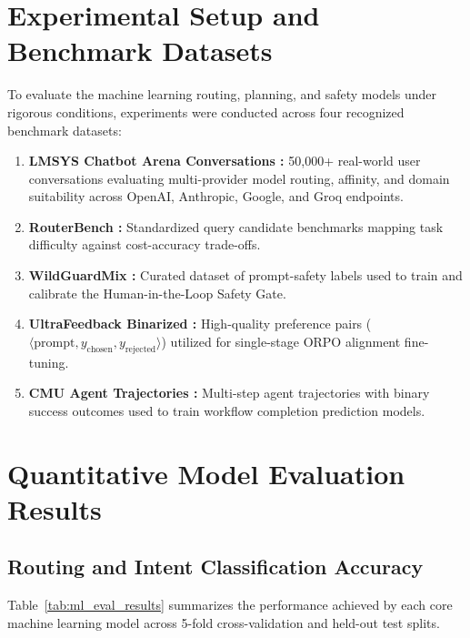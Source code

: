 \documentclass[12pt,a4paper]{report}
\begin{document}
\section{Experimental Setup and Benchmark Datasets}
To evaluate the machine learning routing, planning, and safety models under rigorous conditions, experiments were conducted across four recognized benchmark datasets:
\begin{enumerate}
    \item \textbf{LMSYS Chatbot Arena Conversations \cite{ref_lmsys}:} 50,000+ real-world user conversations evaluating multi-provider model routing, affinity, and domain suitability across OpenAI, Anthropic, Google, and Groq endpoints.
    \item \textbf{RouterBench \cite{ref_routerbench}:} Standardized query candidate benchmarks mapping task difficulty against cost-accuracy trade-offs.
    \item \textbf{WildGuardMix \cite{ref_wildguard}:} Curated dataset of prompt-safety labels used to train and calibrate the Human-in-the-Loop Safety Gate.
    \item \textbf{UltraFeedback Binarized \cite{ref_ultrafeedback}:} High-quality preference pairs ($\langle \text{prompt}, y_{\text{chosen}}, y_{\text{rejected}} \rangle$) utilized for single-stage ORPO alignment fine-tuning.
    \item \textbf{CMU Agent Trajectories \cite{ref_agent_trajectories}:} Multi-step agent trajectories with binary success outcomes used to train workflow completion prediction models.
\end{enumerate}

\section{Quantitative Model Evaluation Results}

\subsection{Routing and Intent Classification Accuracy}
Table~\ref{tab:ml_eval_results} summarizes the performance achieved by each core machine learning model across 5-fold cross-validation and held-out test splits.
\end{document}
